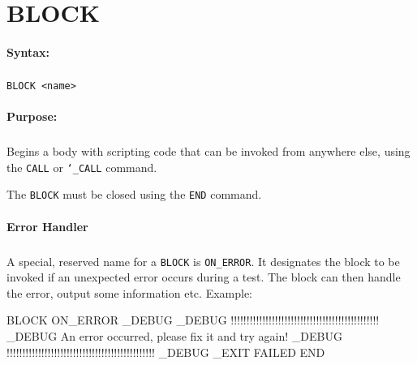 
\newpage
\section{BLOCK}
\label{cmd:BLOCK}

\paragraph{Syntax:}
\subparagraph{}
\texttt{BLOCK <name>}

\paragraph{Purpose:}
\subparagraph{}
Begins a body with scripting code that can be invoked from anywhere 
else, using the \texttt{CALL} or \texttt{\char`\_CALL} command.

The \texttt{BLOCK} must be closed using the \texttt{END} command.

\paragraph{Error Handler}
\subparagraph{}
A special, reserved name for a \texttt{BLOCK} is \texttt{ON\_ERROR}. It 
designates the block to be invoked if an unexpected error occurs during 
a test. The block can then handle the error, output some information etc. 
Example:

\begin{usplisting}
    BLOCK ON_ERROR
    _DEBUG
    _DEBUG !!!!!!!!!!!!!!!!!!!!!!!!!!!!!!!!!!!!!!!!!!!!!!!
    _DEBUG An error occurred, please fix it and try again!
    _DEBUG !!!!!!!!!!!!!!!!!!!!!!!!!!!!!!!!!!!!!!!!!!!!!!!
    _DEBUG
    _EXIT FAILED
    END
\end{usplisting}
